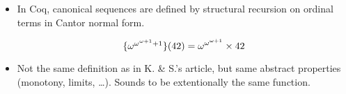 \documentclass[10pt, fleqn]{beamer}
\begin{document}
\begin{frame}
   
     \begin{block}{}
       \begin{itemize}
       \item In Coq, canonical sequences are defined by structural recursion on ordinal terms in Cantor normal form.
         
   {\color{mathcolor}
         $$\mbox{$\{\omega^{\omega^{\omega+1}+1}\}(42)$}=
         \omega^{\omega^{\omega+1}}\times 42$$
         }
         
         
       \item Not the same definition as in K. \& S.'s article, but same abstract properties (monotony, limits, \dots). Sounds to be extentionally the same function.
       \end{itemize}
     \end{block}
\end{frame}
\end{document}
